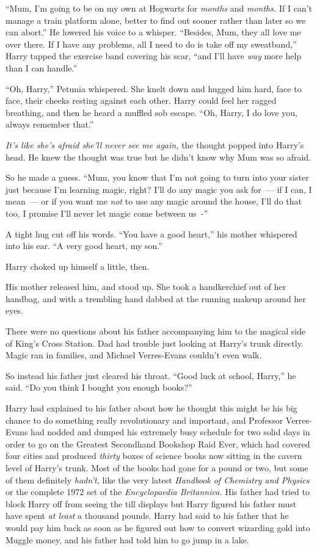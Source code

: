 ``Mum, I'm going to be on my own at Hogwarts for \emph{months} and \emph{months.} If I can't manage a train platform alone, better to find out sooner rather than later so we can abort.'' He lowered his voice to a whisper. ``Besides, Mum, they all love me over there. If I have any problems, all I need to do is take off my sweatband,'' Harry tapped the exercise band covering his scar, ``and I'll have \emph{way} more help than I can handle.''

``Oh, Harry,'' Petunia whispered. She knelt down and hugged him hard, face to face, their cheeks resting against each other. Harry could feel her ragged breathing, and then he heard a muffled sob escape. ``Oh, Harry, I do love you, always remember that.''

\emph{It's like she's afraid she'll never see me again,} the thought popped into Harry's head. He knew the thought was true but he didn't know why Mum was so afraid.

So he made a guess. ``Mum, you know that I'm not going to turn into your sister just because I'm learning magic, right? I'll do any magic you ask for~--- if I can, I mean~--- or if you want me \emph{not} to use any magic around the house, I'll do that too, I promise I'll never let magic come between us~-''

A tight hug cut off his words. ``You have a good heart,'' his mother whispered into his ear. ``A very good heart, my son.''

Harry choked up himself a little, then.

His mother released him, and stood up. She took a handkerchief out of her handbag, and with a trembling hand dabbed at the running makeup around her eyes.

There were no questions about his father accompanying him to the magical side of King's Cross Station. Dad had trouble just looking at Harry's trunk directly. Magic ran in families, and Michael Verres-Evans couldn't even walk.

So instead his father just cleared his throat. ``Good luck at school, Harry,'' he said. ``Do you think I bought you enough books?''

Harry had explained to his father about how he thought this might be his big chance to do something really revolutionary and important, and Professor Verres-Evans had nodded and dumped his extremely busy schedule for two solid days in order to go on the Greatest Secondhand Bookshop Raid Ever, which had covered four cities and produced \emph{thirty} boxes of science books now sitting in the cavern level of Harry's trunk. Most of the books had gone for a pound or two, but some of them definitely \emph{hadn't,} like the very latest \emph{Handbook of Chemistry and Physics} or the complete 1972 set of the \emph{Encyclopaedia Britannica.} His father had tried to block Harry off from seeing the till displays but Harry figured his father must have spent \emph{at least} a thousand pounds. Harry had said to his father that he would pay him back as soon as he figured out how to convert wizarding gold into Muggle money, and his father had told him to go jump in a lake.


